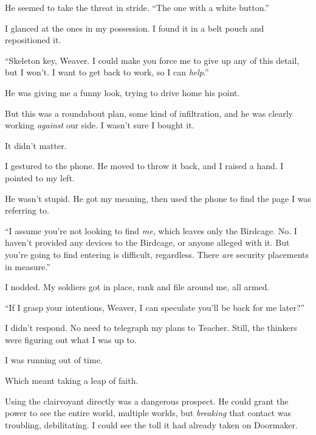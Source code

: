 He seemed to take the threat in stride.  ``The one with a white button.''



I glanced at the ones in my possession.  I found it in a belt pouch and repositioned it.



``Skeleton key, Weaver.  I could make you force me to give up any of this detail, but I won't.  I want to get back to work, so I can \emph{help}.''



He was giving me a funny look, trying to drive home his point.



But this was a roundabout plan, some kind of infiltration, and he was clearly working \emph{against} our side.  I wasn't sure I bought it.



It didn't matter.



I gestured to the phone.  He moved to throw it back, and I raised a hand.  I pointed to my left.



He wasn't stupid.  He got my meaning, then used the phone to find the page I was referring to.



``I assume you're not looking to find \emph{me, }which leaves only the Birdcage.  No.  I haven't provided any devices to the Birdcage, or anyone alleged with it.  But you're going to find entering is difficult, regardless.  There \emph{are} security placements in measure.''



I nodded.  My soldiers got in place, rank and file around me, all armed.



``If I grasp your intentions, Weaver, I can speculate you'll be back for me later?''



I didn't respond.  No need to telegraph my plans to Teacher.  Still, the thinkers were figuring out what I was up to.



I was running out of time.



Which meant taking a leap of faith.



Using the clairvoyant directly was a dangerous prospect.  He could grant the power to see the entire world, multiple worlds, but \emph{breaking }that contact was troubling, debilitating.  I could see the toll it had already taken on Doormaker.



